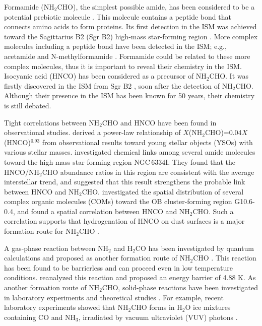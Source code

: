 \documentclass[twocolumn, twocolappendix]{aastex631}
\begin{document}
Formamide (NH$_{2}$CHO), the simplest possible amide, has been considered to be a potential prebiotic molecule \citep[e.g.,][]{2019ESC.....3.2122L}. 
This molecule contains a peptide bond that connects amino acids to form proteins.
Its first detection in the ISM was achieved toward the Sagittarius B2 (Sgr B2) high-mass star-forming region \citep{1971ApJ...169L..39R}.
More complex molecules including a peptide bond have been detected in the ISM; e.g., acetamide \citep[CH$_3$CONH$_2$;][]{2006ApJ...643L..25H} and N-methylformamide \citep[CH$_3$NHCHO;][]{2017A&A...601A..49B,2020ApJ...901...37L}.
Formamide could be related to these more complex molecules, thus it is important to reveal their chemistry in the ISM.
Isocyanic acid (HNCO) has been considered as a precursor of NH$_{2}$CHO.
It was firstly discovered in the ISM from Sgr B2 \citep{1972ApJ...177..619S}, soon after the detection of NH$_{2}$CHO.
Although their presence in the ISM has been known for 50 years, their chemistry is still debated. 

Tight correlations between NH$_{2}$CHO and HNCO have been found in observational studies.
\citet{2015MNRAS.449.2438L} derived a power-law relationship of $X$(NH$_{2}$CHO)=0.04$X$(HNCO)$^{0.93}$ from observational results toward young stellar objects (YSOs) with various stellar masses.
\citet{2020ApJ...901...37L} investigated chemical links among several amide molecules toward the high-mass star-forming region NGC\,6334I.
They found that the HNCO/NH$_{2}$CHO abundance ratios in this region are consistent with the average interstellar trend, and suggested that this result strengthens the probable link between HNCO and NH$_{2}$CHO.
\citet{2021ApJ...909..214L} investigated the spatial distribution of several complex organic molecules (COMs) toward the OB cluster-forming region G10.6-0.4, and found a spatial correlation between HNCO and NH$_{2}$CHO.
Such a correlation supports that hydrogenation of HNCO on dust surfaces is a major formation route for NH$_{2}$CHO \citep[e.g.,][]{2014MNRAS.445..151M, 2015MNRAS.449.2438L, 2019ESC.....3.2122L,2016PCCP...1829278S}.

A gas-phase reaction between NH$_{2}$ and H$_{2}$CO has been investigated by quantum calculations and proposed as another formation route of NH$_{2}$CHO \citep{2015MNRAS.453L..31B}.
This reaction has been found to be barrierless and can proceed even in low temperature conditions.
\citet{2017MNRAS.468L...1S} reanalyzed this reaction and proposed an energy barrier of 4.88 K.
As another formation route of NH$_{2}$CHO, solid-phase reactions have been investigated in laboratory experiments \citep[e.g.,][]{2011ApJ...734...78J,2016MNRAS.460.4297F,2019MNRAS.484L.119D,2020ApJ...894...98M} and theoretical studies \citep[e.g.,][]{2018ESC.....2..720R,2019ESC.....3.2158E,2022ApJS..259...39E}.
For example, recent laboratory experiments showed that NH$_{2}$CHO forms in H$_{2}$O ice mixtures containing CO and NH$_{3}$, irradiated by vacuum ultraviolet (VUV) photons \citep{2022ApJ...933..107C}.
\end{document}
